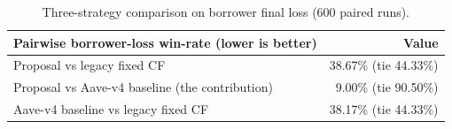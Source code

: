 \begin{table}[h!]
\centering
\caption{Three-strategy comparison on borrower final loss (600 paired runs).}
\label{tab:three_strategy_borrower_loss}

\vspace{0.35em}

\begin{tabular}{@{}p{}r@{}}
\toprule
Pairwise borrower-loss win-rate (lower is better) & Value \\
\midrule
Proposal vs legacy fixed CF & 38.67\% (tie 44.33\%) \\
Proposal vs Aave-v4 baseline (the contribution) & 9.00\% (tie 90.50\%) \\
Aave-v4 baseline vs legacy fixed CF & 38.17\% (tie 44.33\%) \\
\bottomrule
\end{tabular}
\end{table}
